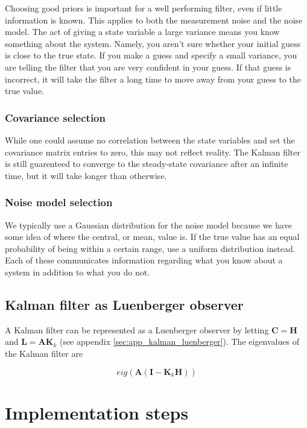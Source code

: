 \documentclass[10pt,conference,compsoc]{IEEEtran}
\newcommand{\mtx}[1] {\bm #1}
\begin{document}
Choosing good priors is important for a well performing filter, even if little
information is known. This applies to both the measurement noise and the noise
model. The act of giving a state variable a large variance means you know
something about the system. Namely, you aren't sure whether your initial guess
is close to the true state. If you make a guess and specify a small variance,
you are telling the filter that you are very confident in your guess. If that
guess is incorrect, it will take the filter a long time to move away from your
guess to the true value.

\subsubsection{Covariance selection}

While one could assume no correlation between the state variables and set the
covariance matrix entries to zero, this may not reflect reality. The Kalman
filter is still guarenteed to converge to the steady-state covariance after an
infinite time, but it will take longer than otherwise.

\subsubsection{Noise model selection}

We typically use a Gaussian distribution for the noise model because we have
some idea of where the central, or mean, value is. If the true value has an
equal probability of being within a certain range, use a uniform distribution
instead. Each of these communicates information regarding what you know about a
system in addition to what you do not.

\subsection{Kalman filter as Luenberger observer}

A Kalman filter can be represented as a Luenberger observer by letting
$\mtx{C} = \mtx{H}$ and $\mtx{L} = \mtx{A} \mtx{K}_k$ (see appendix
\ref{sec:app_kalman_luenberger}). The eigenvalues of the Kalman filter are

\begin{equation}
  eig(\mtx{A}(\mtx{I} - \mtx{K}_k\mtx{H}))
\end{equation}

\section{Implementation steps}
\end{document}

